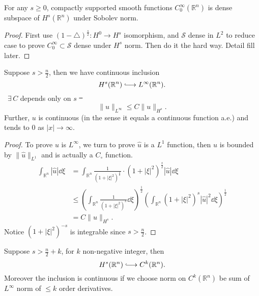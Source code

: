 \documentclass[UTF8,12pt]{article}
\numberwithin{theorem}{section}
\numberwithin{equation}{section}
\newcommand{\hooklongrightarrow}{\lhook\joinrel\longrightarrow}
\begin{document}
\begin{prop}
    For any \(s\ge 0\), compactly supported smooth functions \(C_0^\infty
    (\mathbb{R}^n)\) is dense subspace of \(H^s(\mathbb{R}^n)\) under Sobolev norm.
\end{prop}
\begin{proof}
    First use \((1-\triangle)^{\frac{s}{2}}\colon H^0\to H^s\) isomorphism,
    and \(\mathcal{S}\) dense in \(L^2\) to reduce case to prove
    \(C_0^\infty\subset \mathcal{S}\) dense under \(H^s\) norm. Then do it the hard
    way. Detail fill later.
\end{proof}

\begin{theorem}\hfill\par
    Suppose \(s>\frac{n}{2}\), then we have continuous inclusion \[
        H^s(\mathbb{R}^n)\hooklongrightarrow L^\infty(\mathbb{R}^n)
    .\] \ie\ \(\exists\,C\) depends only on \(s\) \st\ \[
        \|u\|_{L^\infty}\le C\|u\|_{H^s}
    .\] Further, \(u\) is continuous (in the sense it equals a continuous function
    a.e.) and tends to 0 as \(|x|\to \infty\).
\end{theorem}
\begin{proof}
    To prove \(u\) is \(L^\infty\), we turn to prove \(\hat{u}\) is a \(L^1\)
    function, then \(u\) is bounded by \(\|\hat{u}\|_{L^1}\) and is actually
    a \(C_{\circ}\) function.
    \begin{align*}
        \int_{\mathbb{R}^n}|\hat{u}|\dd{\xi}
        &=\int_{\mathbb{R}^n}\frac{1}{(1+|\xi|^2)^{\frac{s}{2}}}\cdot 
        (1+|\xi|^2)^{\frac{s}{2}}|\hat{u}|\dd{\xi} \\
        &\le \left(\int_{\mathbb{R}^n}\frac{1}{(1+|\xi|^2)^s}\dd{\xi}\right)
        ^{\frac{1}{2}}\left(\int_{\mathbb{R}^n}(1+|\xi|^2)^s |\hat{u}|^2\dd{\xi}
        \right)^{\frac{1}{2}} \\
        &=C\|u\|_{H^s}
    .\end{align*}
    Notice \((1+|\xi|^2)^{-s}\) is integrable since \(s>\frac{n}{2}\).
\end{proof}

\begin{corollary}
    Suppose \(s>\frac{n}{2}+k\), for \(k\) non-negative integer, then \[
        H^s(\mathbb{R}^n)\hooklongrightarrow C^k(\mathbb{R}^n)
    .\] Moreover the inclusion is continuous if we choose norm on
    \(C^k(\mathbb{R}^n)\) be sum of \(L^\infty\) norm of \(\le k\) order derivatives.
\end{corollary}
\end{document}
